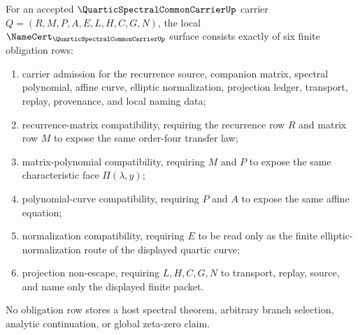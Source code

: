 \begin{definition}
\label{def:quartic-spectral-carrier-namecert-obligations}
For an accepted $\QuarticSpectralCommonCarrierUp$ carrier $Q=(R,M,P,A,E,L,H,C,G,N)$, the local $\NameCert_{\QuarticSpectralCommonCarrierUp}$ surface consists exactly of six finite obligation rows:
\begin{enumerate}
\item carrier admission for the recurrence source, companion matrix, spectral polynomial, affine curve, elliptic normalization, projection ledger, transport, replay, provenance, and local naming data;
\item recurrence-matrix compatibility, requiring the recurrence row $R$ and matrix row $M$ to expose the same order-four transfer law;
\item matrix-polynomial compatibility, requiring $M$ and $P$ to expose the same characteristic face $\Pi(\lambda,y)$;
\item polynomial-curve compatibility, requiring $P$ and $A$ to expose the same affine equation;
\item normalization compatibility, requiring $E$ to be read only as the finite elliptic-normalization route of the displayed quartic curve;
\item projection non-escape, requiring $L,H,C,G,N$ to transport, replay, source, and name only the displayed finite packet.
\end{enumerate}
No obligation row stores a host spectral theorem, arbitrary branch selection, analytic continuation, or global zeta-zero claim.
\end{definition}

